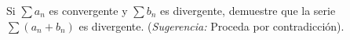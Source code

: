 \item Si $\sum a_n$ es convergente y $\sum b_n$ es divergente, demuestre que la serie $\sum (a_n + b_n)$ es divergente. (\textit{Sugerencia:} Proceda por contradicción).
